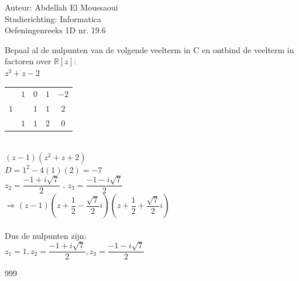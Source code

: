 \documentclass[a4paper]{article}
\begin{document}
  
\noindent \large Auteur: Abdellah El Moussaoui \\
\noindent \large Studierichting: Informatica\\
\noindent \large Oefeningenreeks 1D nr. 19.6\\

\medskip

\normalsize

Bepaal al de nulpunten van de volgende veelterm in C en ontbind de veelterm in factoren over $\mathbb{R}[z]$: \\

$z^3 + z - 2$\\

\begin{tabular}{c|cccc}
& $1$ & $0$ & $1$ & $-2$\\
$1$ & & $1$ & $1$ & $2$\\ \hline
& $1$ & $1$ & $2$ & $0$
\end{tabular}\\

$(z - 1)(z^2 + z + 2)$\\

$D = 1^2 - 4(1)(2) = -7 $\\

$z_2 = \dfrac{-1+i\sqrt{7}}{2}$ , $z_3 = \dfrac{-1-i\sqrt{7}}{2}$\\

$\Rightarrow \left(z-1\right)\left(z+\dfrac{1}{2}-\dfrac{\sqrt{7}}{2}i\right)\left(z+\dfrac{1}{2}+\dfrac{\sqrt{7}}{2}i\right)$\\\\

Dus de nulpunten zijn:\\

$\boxed{z_1 = 1 , z_2 = \dfrac{-1+i\sqrt{7}}{2} ,z_3 = \dfrac{-1-i\sqrt{7}}{2}}$\\


\begin{thebibliography}{999}
\end{thebibliography}
\end{document}
